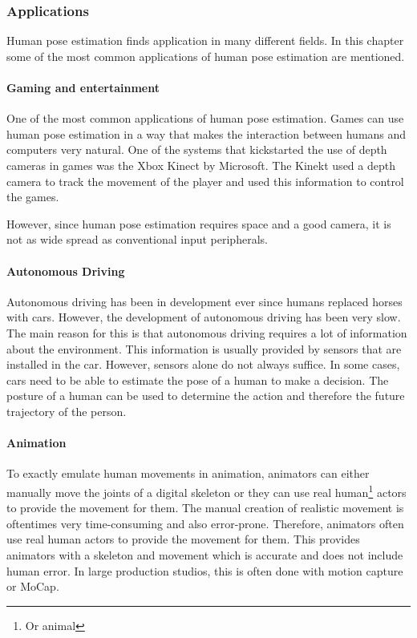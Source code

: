 \subsubsection{Applications}
Human pose estimation finds application in many different fields. In this chapter some of the most common applications of human pose estimation are mentioned.

\paragraph{Gaming and entertainment}

One of the most common applications of human pose estimation. Games can use human pose estimation in a way that makes the interaction between humans and computers very natural. One of the systems that kickstarted the use of depth cameras in games was the Xbox Kinect by Microsoft. The Kinekt used a depth camera to track the movement of the player and used this information to control the games. \cite[Citation needed]{}

However, since human pose estimation requires space and a good camera, it is not as wide spread as conventional input peripherals.

\paragraph{Autonomous Driving}

Autonomous driving has been in development ever since humans replaced horses with cars\cite{OldAutoDrive}. However, the development of autonomous driving has been very slow. The main reason for this is that autonomous driving requires a lot of information about the environment. This information is usually provided by sensors that are installed in the car. However, sensors alone do not always suffice. In some cases, cars need to be able to estimate the pose of a human to make a decision. The posture of a human can be used to determine the action and therefore the future trajectory of the person. 

\paragraph{Animation}

To exactly emulate human movements in animation, animators can either manually move the joints of a digital skeleton or they can use real human\footnote{Or animal} actors to provide the movement for them. The manual creation of realistic movement is oftentimes very time-consuming and also error-prone. Therefore, animators often use real human actors to provide the movement for them. This provides animators with a skeleton and movement which is accurate and does not include human error. In large production studios, this is often done with motion capture or MoCap. 

